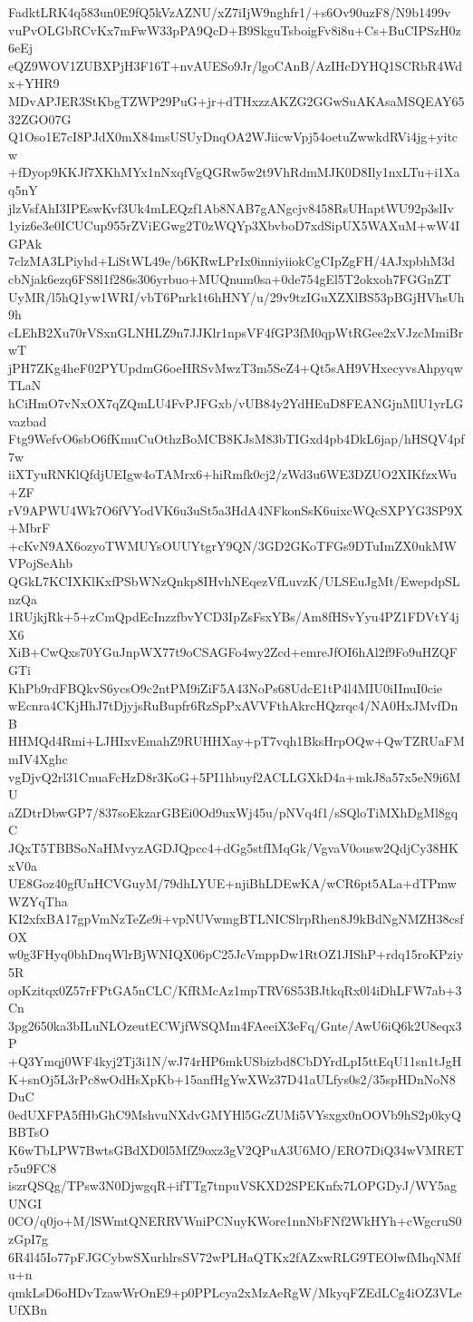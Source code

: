 FadktLRK4q583un0E9fQ5kVzAZNU/xZ7iIjW9nghfr1/+s6Ov90uzF8/N9b1499v
vuPvOLGbRCvKx7mFwW33pPA9QcD+B9SkguTsboigFv8i8u+Cs+BuCIPSzH0z6eEj
eQZ9WOV1ZUBXPjH3F16T+nvAUESo9Jr/lgoCAnB/AzIHcDYHQ1SCRbR4Wdx+YHR9
MDvAPJER3StKbgTZWP29PuG+jr+dTHxzzAKZG2GGwSuAKAsaMSQEAY6532ZGO07G
Q1Oso1E7cI8PJdX0mX84msUSUyDnqOA2WJiicwVpj54oetuZwwkdRVi4jg+yitcw
+fDyop9KKJf7XKhMYx1nNxqfVgQGRw5w2t9VhRdmMJK0D8Ily1nxLTu+i1Xaq5nY
jlzVsfAhI3IPEswKvf3Uk4mLEQzf1Ab8NAB7gANgcjv8458RsUHaptWU92p3slIv
1yiz6e3e0ICUCup955rZViEGwg2T0zWQYp3XbvboD7xdSipUX5WAXuM+wW4IGPAk
7clzMA3LPiyhd+LiStWL49e/b6KRwLPrIx0inniyiiokCgCIpZgFH/4AJxpbhM3d
cbNjak6ezq6FS8l1f286s306yrbuo+MUQnum0sa+0de754gEl5T2okxoh7FGGnZT
UyMR/l5hQ1yw1WRI/vbT6Pnrk1t6hHNY/u/29v9tzIGuXZXlBS53pBGjHVhsUh9h
cLEhB2Xu70rVSxnGLNHLZ9n7JJKlr1npsVF4fGP3fM0qpWtRGee2xVJzcMmiBrwT
jPH7ZKg4heF02PYUpdmG6oeHRSvMwzT3m5SeZ4+Qt5sAH9VHxecyvsAhpyqwTLaN
hCiHmO7vNxOX7qZQmLU4FvPJFGxb/vUB84y2YdHEuD8FEANGjnMlU1yrLGvazbad
Ftg9WefvO6sbO6fKmuCuOthzBoMCB8KJsM83bTIGxd4pb4DkL6jap/hHSQV4pf7w
iiXTyuRNKlQfdjUEIgw4oTAMrx6+hiRmfk0cj2/zWd3u6WE3DZUO2XIKfzxWu+ZF
rV9APWU4Wk7O6fVYodVK6u3uSt5a3HdA4NFkonSsK6uixcWQcSXPYG3SP9X+MbrF
+cKvN9AX6ozyoTWMUYsOUUYtgrY9QN/3GD2GKoTFGs9DTuImZX0ukMWVPojSeAhb
QGkL7KCIXKlKxfPSbWNzQnkp8IHvhNEqezVfLuvzK/ULSEuJgMt/EwepdpSLnzQa
1RUjkjRk+5+zCmQpdEcInzzfbvYCD3IpZsFsxYBs/Am8fHSvYyu4PZ1FDVtY4jX6
XiB+CwQxs70YGuJnpWX77t9oCSAGFo4wy2Zcd+emreJfOI6hAl2f9Fo9uHZQFGTi
KhPb9rdFBQkvS6ycsO9c2ntPM9iZiF5A43NoPs68UdcE1tP4l4MIU0iIInuI0cie
wEcnra4CKjHhJ7tDjyjsRuBupfr6RzSpPxAVVFthAkrcHQzrqc4/NA0HxJMvfDnB
HHMQd4Rmi+LJHIxvEmahZ9RUHHXay+pT7vqh1BksHrpOQw+QwTZRUaFMmIV4Xghc
vgDjvQ2rl31CnuaFcHzD8r3KoG+5PI1hbuyf2ACLLGXkD4a+mkJ8a57x5eN9i6MU
aZDtrDbwGP7/837soEkzarGBEi0Od9uxWj45u/pNVq4f1/sSQloTiMXhDgMl8gqC
JQxT5TBBSoNaHMvyzAGDJQpcc4+dGg5stfIMqGk/VgvaV0ousw2QdjCy38HKxV0a
UE8Goz40gfUnHCVGuyM/79dhLYUE+njiBhLDEwKA/wCR6pt5ALa+dTPmwWZYqTha
KI2xfxBA17gpVmNzTeZe9i+vpNUVwmgBTLNICSlrpRhen8J9kBdNgNMZH38csfOX
w0g3FHyq0bhDnqWlrBjWNIQX06pC25JcVmppDw1RtOZ1JIShP+rdq15roKPziy5R
opKzitqx0Z57rFPtGA5nCLC/KfRMcAz1mpTRV6S53BJtkqRx0l4iDhLFW7ab+3Cn
3pg2650ka3bILuNLOzeutECWjfWSQMm4FAeeiX3eFq/Gnte/AwU6iQ6k2U8eqx3P
+Q3Ymqj0WF4kyj2Tj3i1N/wJ74rHP6mkUSbizbd8CbDYrdLpI5ttEqU11sn1tJgH
K+snOj5L3rPc8wOdHsXpKb+15anfHgYwXWz37D41aULfys0s2/35spHDnNoN8DuC
0edUXFPA5fHbGhC9MshvuNXdvGMYHl5GcZUMi5VYsxgx0nOOVb9hS2p0kyQBBTsO
K6wTbLPW7BwtsGBdXD0l5MfZ9oxz3gV2QPuA3U6MO/ERO7DiQ34wVMRETr5u9FC8
iszrQSQg/TPsw3N0DjwgqR+ifTTg7tnpuVSKXD2SPEKnfx7LOPGDyJ/WY5agUNGI
0CO/q0jo+M/lSWmtQNERRVWniPCNuyKWore1nnNbFNf2WkHYh+cWgcruS0zGpI7g
6R4l45Io77pFJGCybwSXurhlrsSV72wPLHaQTKx2fAZxwRLG9TEOlwfMhqNMfu+n
qmkLsD6oHDvTzawWrOnE9+p0PPLcya2xMzAeRgW/MkyqFZEdLCg4iOZ3VLeUfXBn
